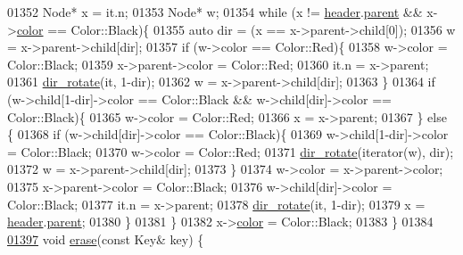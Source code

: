 \begin{DoxyCode}
01352         Node* x = it.n;
01353         Node* w;
01354         \textcolor{keywordflow}{while} (x != \hyperlink{classaed2_1_1map_a92d93f905c8ad73fba18fdc7e8915cce_a92d93f905c8ad73fba18fdc7e8915cce}{header}.\hyperlink{structaed2_1_1map_1_1Node_ab6a5f9e471b311755e4a56834086cb90_ab6a5f9e471b311755e4a56834086cb90}{parent} && x->\hyperlink{structaed2_1_1map_1_1Node_a58dd9993fee8ee3eaa5716b72a3eca47_a58dd9993fee8ee3eaa5716b72a3eca47}{color} == Color::Black)\{
01355             \textcolor{keyword}{auto} dir = (x == x->parent->child[0]);
01356             w = x->parent->child[dir];
01357             \textcolor{keywordflow}{if} (w->color == Color::Red)\{
01358                 w->color = Color::Black;
01359                 x->parent->color = Color::Red;
01360                 it.n = x->parent;
01361                 \hyperlink{classaed2_1_1map_a94f2862ada0c9ed4f4457eac42ea8f23_a94f2862ada0c9ed4f4457eac42ea8f23}{dir\_rotate}(it, 1-dir);
01362                 w = x->parent->child[dir];
01363             \}
01364             \textcolor{keywordflow}{if} (w->child[1-dir]->color == Color::Black && w->child[dir]->color == Color::Black)\{
01365                 w->color = Color::Red;
01366                 x = x->parent;
01367             \} \textcolor{keywordflow}{else} \{
01368                 \textcolor{keywordflow}{if} (w->child[dir]->color == Color::Black)\{
01369                     w->child[1-dir]->color = Color::Black;
01370                     w->color = Color::Red;
01371                     \hyperlink{classaed2_1_1map_a94f2862ada0c9ed4f4457eac42ea8f23_a94f2862ada0c9ed4f4457eac42ea8f23}{dir\_rotate}(iterator(w), dir);
01372                     w = x->parent->child[dir];
01373                 \}
01374                 w->color = x->parent->color;
01375                 x->parent->color = Color::Black;
01376                 w->child[dir]->color = Color::Black;
01377                 it.n = x->parent;
01378                 \hyperlink{classaed2_1_1map_a94f2862ada0c9ed4f4457eac42ea8f23_a94f2862ada0c9ed4f4457eac42ea8f23}{dir\_rotate}(it, 1-dir);
01379                 x = \hyperlink{classaed2_1_1map_a92d93f905c8ad73fba18fdc7e8915cce_a92d93f905c8ad73fba18fdc7e8915cce}{header}.\hyperlink{structaed2_1_1map_1_1Node_ab6a5f9e471b311755e4a56834086cb90_ab6a5f9e471b311755e4a56834086cb90}{parent};
01380             \}
01381         \}
01382         x->\hyperlink{structaed2_1_1map_1_1Node_a58dd9993fee8ee3eaa5716b72a3eca47_a58dd9993fee8ee3eaa5716b72a3eca47}{color} = Color::Black;
01383     \}
01384 
\hyperlink{classaed2_1_1map_a2ffadb42cd5f0bc7b3752ff159b75334_a2ffadb42cd5f0bc7b3752ff159b75334}{01397}     \textcolor{keywordtype}{void} \hyperlink{classaed2_1_1map_a2ffadb42cd5f0bc7b3752ff159b75334_a2ffadb42cd5f0bc7b3752ff159b75334}{erase}(\textcolor{keyword}{const} Key& key) \{

\end{DoxyCode}
